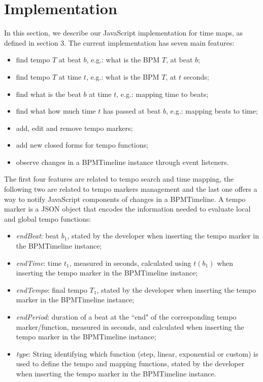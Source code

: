 \documentclass{sig-alternate}
\begin{document}
\section{Implementation}
In this section, we describe our JavaScript implementation for time maps, as defined in section 3. The current implementation has seven main features: 
\begin{itemize}
	\item find tempo $T$ at beat $b$, e.g.: what is the BPM $T$, at beat $b$;
	\item find tempo  $T$ at time $t$, e.g.: what is the BPM $T$, at $t$ seconds;
	\item find what is the beat $b$ at time $t$, e.g.: mapping time to beats;
	\item find what how much time $t$ has passed at beat $b$, e.g.: mapping beats to time;
	\item add, edit and remove tempo markers;
	\item add new closed forms for tempo functions;
	\item observe changes in a BPMTimeline instance through event listeners.
\end{itemize}
The first four features are related to tempo search and time mapping, the following two are related to tempo markers management and the last one offers a way to notify JavaScript components of changes in a BPMTimeline. A tempo marker is a JSON object that encodes the information needed to evaluate local and global tempo functions: 
\begin{itemize}
 	\item \textit{endBeat}: beat $b_1$, stated by the developer when inserting the tempo marker in the BPMTimeline instance;
 	\item \textit{endTime}: time $t_1$, measured in seconds, calculated using $t(b_1)$ when inserting the tempo marker in the BPMTimeline instance; 
 	\item \textit{endTempo}: final tempo $T_1$, stated by the developer when inserting the tempo marker in the BPMTimeline instance;
 	\item \textit{endPeriod}: duration of a beat at the ``end" of the corresponding tempo marker/function, measured in seconds, and calculated when inserting the tempo marker in the BPMTimeline instance;
 	\item \textit{type}: String identifying which function (step, linear, exponential or custom) is used to define the tempo and mapping functions, stated by the developer when inserting the tempo marker in the BPMTimeline instance.
\end{itemize}
\end{document}
